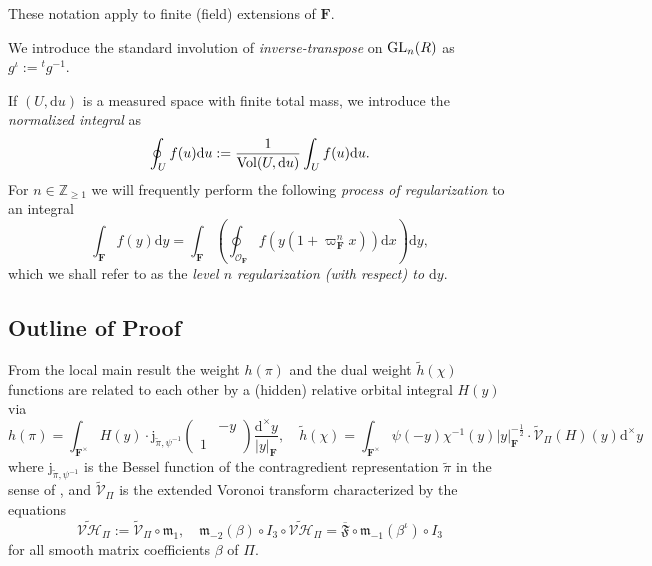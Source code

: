 \documentclass[A4]{amsart}
\def\geq{\geqslant}
\numberwithin{equation}{section} \everymath{\displaystyle}
\newcommand{\GL}{{\rm GL}}
\newcommand{\Z}{\mathbb{Z}}
\newcommand{\ud}{\mathrm{d}}
\newcommand{\F}{\mathbf{F}}
\newcommand{\vO}{\mathcal{O}}
\newcommand{\norm}[1][\cdot]{\lvert #1 \rvert}
\newcommand{\invOFour}{\overline{\mathfrak{F}}}
\newcommand{\Mult}{\mathfrak{m}}
\newcommand{\Vor}{\mathcal{V}}
\newcommand{\VorH}{\mathcal{VH}}
\newcommand{\BesselF}{\mathrm{j}}
\newcommand{\Vol}{{\rm Vol}}
\begin{document}
	These notation apply to finite (field) extensions of $\F$.
	
	We introduce the standard involution of \emph{inverse-transpose} on $\GL_n(R)$ as $g^{\iota} := {}^tg^{-1}$.
	
	If $(U,\ud u)$ is a measured space with finite total mass, we introduce the \emph{normalized integral} as
\begin{equation} \label{eq: NormInt} 
	\oint_U f(u) \ud u := \frac{1}{\Vol(U, \ud u)} \int_U f(u) \ud u. 
\end{equation}
	For $n \in \Z_{\geq 1}$ we will frequently perform the following \emph{process of regularization} to an integral
\begin{equation} \label{eq: LnReg}
	\int_{\F} f(y) \ud y = \int_{\F} \left( \oint_{\vO_{\F}} f(y(1+\varpi_{\F}^nx)) \ud x \right) \ud y,
\end{equation}
	which we shall refer to as the \emph{level $n$ regularization (with respect) to $\ud y$}.


	\subsection{Outline of Proof}
	\label{sec: Outline}
	
	From the local main result \cite[Theorem 1.4]{Wu24+} the weight $h(\pi)$ and the dual weight $\widetilde{h}(\chi)$ functions are related to each other by a (hidden) relative orbital integral $H(y)$ via
\begin{equation} \label{eq: WtFviaBOI}
	h(\pi) = \int_{\F^{\times}} H(y) \cdot \BesselF_{\widetilde{\pi},\psi^{-1}} \begin{pmatrix} & -y \\ 1 & \end{pmatrix} \frac{\ud^{\times}y}{\norm[y]_{\F}}, \quad \widetilde{h}(\chi) = \int_{\F^{\times}} \psi(-y) \chi^{-1}(y) \norm[y]_{\F}^{-\frac{1}{2}} \cdot \widetilde{\Vor}_{\Pi}(H)(y) \ud^{\times} y
\end{equation}
	where $\BesselF_{\widetilde{\pi},\psi^{-1}}$ is the Bessel function of the contragredient representation $\widetilde{\pi}$ in the sense of \cite[\S 3.5]{BM05}, and $\widetilde{\Vor}_{\Pi}$ is the extended Voronoi transform characterized by the equations
	$$ \widetilde{\VorH}_{\Pi} :=\widetilde{\Vor}_{\Pi} \circ \Mult_{1}, \quad \Mult_{-2}(\beta) \circ I_3 \circ \widetilde{\VorH}_{\Pi} = \invOFour \circ \Mult_{-1}(\beta^{\iota}) \circ I_3 $$
	for all smooth matrix coefficients $\beta$ of $\Pi$.
	
\end{document}
